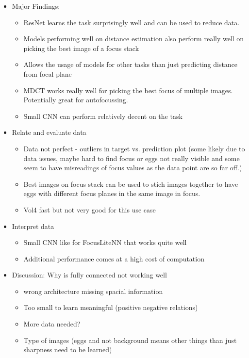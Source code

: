 \begin{itemize}
    \item Major Findings:
    \begin{itemize}
        \item ResNet learns the task surprisingly well and can be used to reduce data.
        \item Models performing well on distance estimation also perform really well on picking the best image of a focus stack
        \item Allows the usage of models for other tasks than just predicting distance from focal plane
        \item MDCT works really well for picking the best focus of multiple images. Potentially great for autofocussing.
        \item Small CNN can perform relatively decent on the task
    \end{itemize}
    \item Relate and evaluate data
    \begin{itemize}
        \item Data not perfect - outliers in target vs. prediction plot (some likely due to data issues, maybe hard to find focus or eggs not really visible and some seem to have misreadings of focus values as the data point are so far off.)
        \item Best images on focus stack can be used to stich images together to have eggs with different focus planes in the same image in focus.
        \item Vol4 fast but not very good for this use case
    \end{itemize}
    \item Interpret data
    \begin{itemize}
        \item Small CNN like for FocusLiteNN that works quite well
        \item Additional performance comes at a high cost of computation
    \end{itemize}
    \item Discussion: Why is fully connected not working well
    \begin{itemize}
        \item wrong architecture missing spacial information
        \item Too small to learn meaningful (positive negative relations)
        \item More data needed?
        \item Type of images (eggs and not background means other things than just sharpness need to be learned)
    \end{itemize}
\end{itemize}




